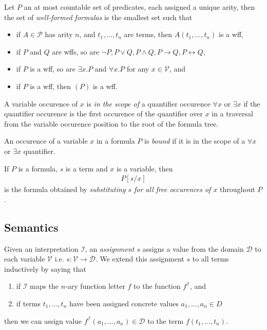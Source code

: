 \documentclass{article}
\begin{document}
\begin{definition}
	Let $P$ an at most countable set of predicates, each assigned a unique arity,
	then the set of \emph{well-formed formulas} is the smallest set such that
	\begin{itemize}
		\item if $A\in \mathcal{P}$ has arity $n$, and $t_1,...,t_n$ are terms, then $A(t_1, ..., t_n)$ is a wff,
		\item if $P$ and $Q$ are wffs, so are $\neg P,P\vee Q,P\wedge Q,P\rightarrow Q,P\leftrightarrow Q$,
		\item if $P$ is a wff, so are $\exists x. P$ and $\forall x. P$ for any $x\in \mathcal{V}$, and
		\item if $P$ is a wff, then $(P)$ is a wff.
	\end{itemize}
\end{definition}

\begin{definition}
	A variable occurence of $x$ is \emph{in the scope of} a quantifier
	occurence $\forall x$ or $\exists x$ if the quantifier occurence is
	the first occurence of the quantifier over $x$ in a traversal from the
	variable occurence position to the root of the formula tree.

	An occurence of a variable $x$ in a formula $P$ is \emph{bound} if it
	is in the scope of a $\forall x$ or $\exists x$ quantifier.
\end{definition}

\begin{definition}
	If $P$ is a formula, $s$ is a term and $x$ is a variable, then
	\begin{align*}
		P[s/x]
	\end{align*}
	is the formula obtained by \emph{substituting $s$ for all free occurences of $x$}
	throughout $P$.
\end{definition}

\subsection{Semantics}

\begin{definition}[Assignment]
	Given an interpretation $\mathcal{I}$, an \emph{assignment $s$} assigns a value
	from the domain $\mathcal{D}$ to each variable $\mathcal{V}$ i.e. $s:\mathcal{V}\to\mathcal{D}$.
	We extend this assignment $s$ to all terms inductively by saying that
	\begin{enumerate}
		\item if $\mathcal{I}$ maps the $n$-ary function letter $f$ to the function $f^\mathcal{I}$, and
		\item if terms $t_1, ..., t_n$ have been assigned concrete values $a_1,...,a_n\in D$
	\end{enumerate}
	then we can assign value $f^\mathcal{I}(a_1,...,a_n)\in\mathcal{D}$ to the term
	$f(t_1,...,t_n)$.
\end{definition}
\end{document}
